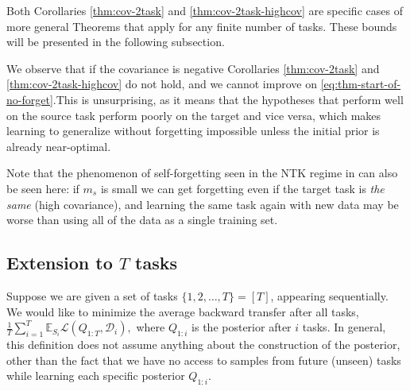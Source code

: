 \documentclass{article}
\theoremstyle{plain}
\theoremstyle{definition}
\theoremstyle{remark}
\newcommand{\RM}[1]{{\textcolor{magenta}{#1}}}
\begin{document}
Both Corollaries \ref{thm:cov-2task} and \ref{thm:cov-2task-highcov} are specific cases of more general Theorems that apply for any finite number of tasks. These bounds will be presented in the following subsection.

We observe that if the covariance is negative Corollaries \ref{thm:cov-2task} and \ref{thm:cov-2task-highcov} do not hold, and we cannot improve on \eqref{eq:thm-start-of-no-forget}.This is unsurprising, as it means that the hypotheses that perform well on the source task perform poorly on the target and vice versa, which makes learning to generalize without forgetting impossible unless the initial prior is already near-optimal.

Note that the phenomenon of self-forgetting seen in the NTK regime in \citep{karakida2021learning} can also be seen here: if $m_s$ is small we can get forgetting even if the target task is \emph{the same} (high covariance), and learning the same task again with new data may be worse than using all of the data as a single training set.

\subsection{Extension to \texorpdfstring{$T$}{T} tasks}


Suppose we are given a set of tasks $\{1,2,\ldots, T\} = [T]$, appearing sequentially.
We would like to minimize the average backward transfer after all tasks, $\frac{1}{T}\sum_{i=1}^T
\mathbb{E}_{S_i}\mathcal{L}(Q_{1:T}, \mathcal{D}_i),$
where $Q_{1:i}$ is the posterior after $i$ tasks. In general, this definition does not assume anything about the construction of the posterior, other than the fact that we have no access to samples from future (unseen) tasks while learning each specific posterior $Q_{1:i}$. 
\end{document}
